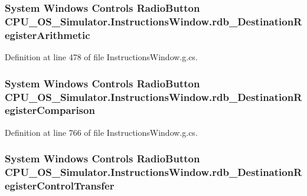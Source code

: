 \subsubsection[{rdb\+\_\+\+Destination\+Register\+Arithmetic}]{\setlength{\rightskip}{0pt plus 5cm}System Windows Controls Radio\+Button C\+P\+U\+\_\+\+O\+S\+\_\+\+Simulator.\+Instructions\+Window.\+rdb\+\_\+\+Destination\+Register\+Arithmetic\hspace{0.3cm}{\ttfamily [package]}}\label{class_c_p_u___o_s___simulator_1_1_instructions_window_a40ebdc8941fbd7ae75ca6d14d1153569}


Definition at line 478 of file Instructions\+Window.\+g.\+cs.

\hypertarget{class_c_p_u___o_s___simulator_1_1_instructions_window_af5369f91639cf92cbb6bd89118d6e373}{}
\subsubsection[{rdb\+\_\+\+Destination\+Register\+Comparison}]{\setlength{\rightskip}{0pt plus 5cm}System Windows Controls Radio\+Button C\+P\+U\+\_\+\+O\+S\+\_\+\+Simulator.\+Instructions\+Window.\+rdb\+\_\+\+Destination\+Register\+Comparison\hspace{0.3cm}{\ttfamily [package]}}\label{class_c_p_u___o_s___simulator_1_1_instructions_window_af5369f91639cf92cbb6bd89118d6e373}


Definition at line 766 of file Instructions\+Window.\+g.\+cs.

\hypertarget{class_c_p_u___o_s___simulator_1_1_instructions_window_a4911636b6e093aa89155a0f5db4b3118}{}
\subsubsection[{rdb\+\_\+\+Destination\+Register\+Control\+Transfer}]{\setlength{\rightskip}{0pt plus 5cm}System Windows Controls Radio\+Button C\+P\+U\+\_\+\+O\+S\+\_\+\+Simulator.\+Instructions\+Window.\+rdb\+\_\+\+Destination\+Register\+Control\+Transfer\hspace{0.3cm}{\ttfamily [package]}}\label{class_c_p_u___o_s___simulator_1_1_instructions_window_a4911636b6e093aa89155a0f5db4b3118}


